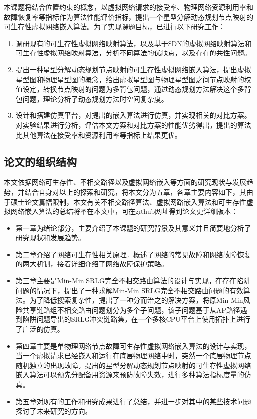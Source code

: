 本课题将结合位置约束的概念，以虚拟网络请求的接受率、物理网络资源利用率和故障恢复率等指标作为算法性能评价指标，提出一个星型分解动态规划节点映射的可生存性虚拟网络嵌入算法。为了实现课题目标，已进行以下研究工作：
\begin{enumerate}
  \item 调研现有的可生存性虚拟网络映射算法，以及基于SDN的虚拟网络映射算法和可生存性虚拟网络映射算法，分析不同算法的优缺点，以及存在的共性问题。
  \item 提出一种星型分解动态规划节点映射的可生存性虚拟网络嵌入算法，提出虚拟星型图和物理星型图的概念，给出虚拟星型图与物理星型图之间节点映射的权值设定，转换节点映射的问题为多背包问题，通过动态规划方法解决这个多背包问题，理论分析了动态规划方法时空间复杂度。
  \item 设计和搭建仿真平台，对提出的嵌入算法进行仿真，并实现相关的对比方案。对实验结果进行分析，评估本文方案和对比方案的性能优劣得出，提出的算法比其他算法在接受率和资源利用率等指标上结果更优。
\end{enumerate}

\subsection{论文的组织结构}
本文依据网络可生存性、不相交路径以及虚拟网络嵌入等方面的研究现状与发展趋势，并结合自身对以上的探索和研究，将本文分为五章，各章主要内容如下，其由于硕士论文篇幅限制，本文有关不相交路径算法、虚拟网路嵌入算法和可生存性虚拟网络嵌入算法的总结将不在本文中，可在github网址\cite{Thesis}得到论文更详细版本：
\begin{itemize}
  \item 第一章为绪论部分，主要介绍了本课题的研究背景及其意义并且简要地分析了研究现状和发展趋势。
  \item 第二章介绍了网络可生存性相关原理，概述了网络的常见故障和网络故障恢复的两大机制，接着详细介绍了网络故障保护策略。
  \item 第三章主要是Min-Min SRLG完全不相交路由算法的设计与实现，在存在陷阱问题的情况下，提出了一种求解Min-Min SRLG完全不相交路由问题的有效算法。为了降低搜索复杂性，提出了一种分而治之的解决方案，将原Min-Min风险共享链路组不相交路由问题划分为多个子问题，该子问题基于从AP路径遇到陷阱问题导出的SRLG冲突链路集，在一个多核CPU平台上使用拓扑上进行了广泛的仿真。
  \item 第四章主要是单物理网络节点故障可生存性虚拟网络嵌入算法的设计与实现，当一个虚拟请求已经嵌入和运行在底层物理网络中时，突然一个底层物理节点随机独立的出现故障，提出的星型分解动态规划节点映射的可生存性虚拟网络嵌入算法可以预先分配备用资源来预防故障失效，进行多种算法指标度量的仿真。
  \item 第五章对现有的工作和研究成果进行了总结，并进一步对其中的某些技术问题探讨了未来研究的方向。
\end{itemize}

